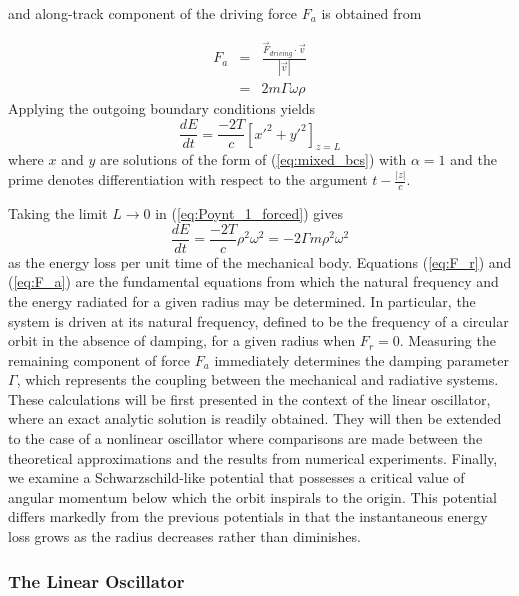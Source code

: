 and along-track component of the driving force $F_a$ is obtained 
from

\begin{eqnarray}\label{eq:F_a}
	F_a & = &  
		\frac{ {\vec F}_{driving} \cdot {\vec v} }{|{\vec v}|} \nonumber \\
            & = & 2 m \Gamma \omega \rho
\end{eqnarray}
Applying the outgoing boundary conditions yields
\begin{equation}\label{eq:Poynt_1_forced}
\frac{dE}{dt} = \frac{-2T}{c}\left[{x'}^2 + {y'}^2 \right]_{z=L}
\end{equation}
where $x$ and $y$ are solutions of the form of 
(\ref{eq:mixed_bcs}) with $\alpha = 1$ and the prime denotes 
differentiation with respect to the argument $t - \frac{|z|}{c}$.

Taking the limit $L \rightarrow 0$ in (\ref{eq:Poynt_1_forced})
gives 
\begin{equation}\label{eq:Poynt_2}
 \frac{dE}{dt} = \frac{-2T}{c}\rho^2 \omega^2 = -2 \Gamma m \rho^2 \omega^2
\end{equation}
as the energy loss per unit time of the mechanical body.
Equations (\ref{eq:F_r}) and (\ref{eq:F_a}) are the fundamental 
equations from which the natural frequency and the energy 
radiated for a given radius may be determined.  
In particular, the system is driven at its natural frequency, 
defined to be the frequency of a circular orbit in the absence of 
damping, for a given radius when $F_r = 0$.  
Measuring the remaining component of force $F_a$ immediately 
determines the damping parameter $\Gamma$, which represents the 
coupling between the mechanical and radiative systems.  
These calculations will be first presented in the context of the 
linear oscillator, where an exact analytic solution is readily 
obtained.
They will then be extended to the case of a nonlinear oscillator 
where comparisons are made between the theoretical approximations 
and the results from numerical experiments.  
Finally, we examine a Schwarzschild-like potential that possesses
a critical value of angular momentum below which the orbit inspirals to the
origin.  
This potential differs markedly from the previous potentials in 
that the instantaneous energy loss grows as the radius decreases 
rather than diminishes.

\subsubsection{The Linear Oscillator}

